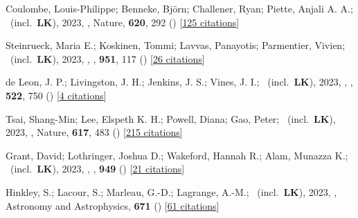 \item[{\color{numcolor}\scriptsize91}] Coulombe, Louis-Philippe; Benneke, Bj{\"o}rn; Challener, Ryan; Piette, Anjali A. A.; \etal\ (incl.\ \textbf{LK}), 2023, , Nature, \textbf{620}, 292 () [\href{https://ui.adsabs.harvard.edu/abs/2023Natur.620..292C}{125 citations}]

\item[{\color{numcolor}\scriptsize90}] Steinrueck, Maria E.; Koskinen, Tommi; Lavvas, Panayotis; Parmentier, Vivien; \etal\ (incl.\ \textbf{LK}), 2023, , \apj, \textbf{951}, 117 () [\href{https://ui.adsabs.harvard.edu/abs/2023ApJ...951..117S}{26 citations}]

\item[{\color{numcolor}\scriptsize89}] de Leon, J. P.; Livingston, J. H.; Jenkins, J. S.; Vines, J. I.; \etal\ (incl.\ \textbf{LK}), 2023, , \mnras, \textbf{522}, 750 () [\href{https://ui.adsabs.harvard.edu/abs/2023MNRAS.522..750D}{4 citations}]

\item[{\color{numcolor}\scriptsize88}] Tsai, Shang-Min; Lee, Elspeth K. H.; Powell, Diana; Gao, Peter; \etal\ (incl.\ \textbf{LK}), 2023, , Nature, \textbf{617}, 483 () [\href{https://ui.adsabs.harvard.edu/abs/2023Natur.617..483T}{215 citations}]

\item[{\color{numcolor}\scriptsize87}] Grant, David; Lothringer, Joshua D.; Wakeford, Hannah R.; Alam, Munazza K.; \etal\ (incl.\ \textbf{LK}), 2023, , \apj, \textbf{949} () [\href{https://ui.adsabs.harvard.edu/abs/2023ApJ...949L..15G}{21 citations}]

\item[{\color{numcolor}\scriptsize86}] Hinkley, S.; Lacour, S.; Marleau, G.-D.; Lagrange, A.-M.; \etal\ (incl.\ \textbf{LK}), 2023, , Astronomy and Astrophysics, \textbf{671} () [\href{https://ui.adsabs.harvard.edu/abs/2023A&A...671L...5H}{61 citations}]


